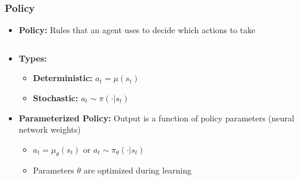 \begin{frame}
    \frametitle{Policy}
    \begin{itemize}
        \item \textbf{Policy:} Rules that an agent uses to decide which actions to take
    \end{itemize}
    \vspace{5pt}
    \setlength{\itemsep}{6pt}
    \setlength{\parskip}{3pt}
    \begin{columns}[T]
        \begin{column}{0.55\textwidth}
            \begin{itemize}
                \item \textbf{Types:}
                \begin{itemize}
                    \item \textbf{Deterministic:} $a_t = \mu(s_t)$
                    \item \textbf{Stochastic:} $a_t \sim \pi(\cdot | s_t)$
                \end{itemize}
                \item \textbf{Parameterized Policy:} Output is a function of policy parameters (neural network weights)
                \begin{itemize}
                    \item $a_t = \mu_{\theta}(s_t)$ or $a_t \sim \pi_{\theta}(\cdot | s_t)$
                    \item Parameters $\theta$ are optimized during learning
                \end{itemize}
            \end{itemize}
        \end{column}
        

\end{columns}
\end{frame}
